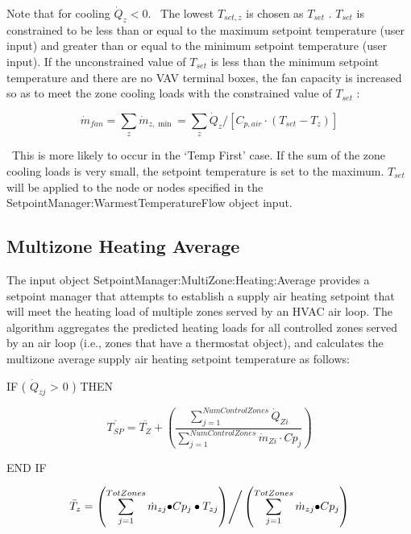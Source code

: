 Note that for cooling \({\dot Q_z} < 0.\) ~The lowest \({T_{set,z}}\) is chosen as \({T_{set}}\) . \({T_{set}}\) is constrained to be less than or equal to the maximum setpoint temperature (user input) and greater than or equal to the minimum setpoint temperature (user input). If the unconstrained value of \({T_{set}}\) is less than the minimum setpoint temperature and there are no VAV terminal boxes, the fan capacity is increased so as to meet the zone cooling loads with the constrained value of \({T_{set}}\) :

\begin{equation}
{\dot m_{fan}} = \sum\limits_z {{{\dot m}_{z,\min }}}  = \sum\limits_z {{{\dot Q}_z}/[{C_{p,air}} \cdot ({T_{set}} - {T_z})]}
\end{equation}

~This is more likely to occur in the `Temp First' case. If the sum of the zone cooling loads is very small, the setpoint temperature is set to the maximum. \({T_{set}}\) will be applied to the node or nodes specified in the SetpointManager:WarmestTemperatureFlow object input.

\subsection{Multizone Heating Average}\label{multizone-heating-average}

The input object SetpointManager:MultiZone:Heating:Average provides a setpoint manager that attempts to establish a supply air heating setpoint that will meet the heating load of multiple zones served by an HVAC air loop. The algorithm aggregates the predicted heating loads for all controlled zones served by an air loop (i.e., zones that have a thermostat object), and calculates the multizone average supply air heating setpoint temperature as follows:

IF ( \({\dot Q_{zj}}\) \textgreater{} 0 ) THEN

\begin{equation}
\overline {{T_{SP}}}  = \overline {{T_Z}}  + \left( {\frac{{\sum\limits_{j = 1}^{NumControlZones} {{{\dot Q}_{Zi}}} }}{{\sum\limits_{j = 1}^{NumControlZones} {{{\dot m}_{Zi}}\cdot C{p_j}} }}} \right)
\end{equation}

END IF

\begin{equation}
{\bar T_z} = {{\left( {\sum\limits_{j = 1}^{TotZones} {{{\dot m}_{zj}} \bullet } C{p_j} \bullet {T_{zj}}} \right)} \mathord{\left/ {\vphantom {{\left( {\sum\limits_{j = 1}^{TotZones} {{{\dot m}_{zj}} \bullet } C{p_j} \bullet {T_{zj}}} \right)} {\left( {\sum\limits_{j = 1}^{TotZones} {{{\dot m}_{zj}} \bullet } C{p_j}} \right)}}} \right. } {\left( {\sum\limits_{j = 1}^{TotZones} {{{\dot m}_{zj}} \bullet } C{p_j}} \right)}}
\end{equation}


